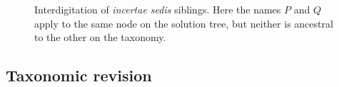 \documentclass[english]{article}
\begin{document}
\begin{figure}
\hfill{}
\hfill{}
\hfill{}
\caption{\label{fig:interdigitation}Interdigitation of \emph{incertae sedis} siblings.  Here the names $P$ and $Q$ apply to the same node on the solution tree, but neither is ancestral to the other on the taxonomy.}
\end{figure}



\subsection{Taxonomic revision}\label{subsec:Placement}
\end{document}
